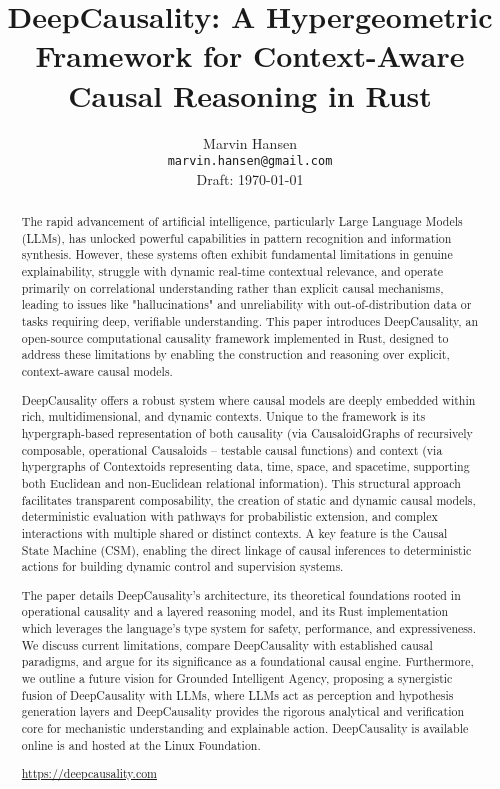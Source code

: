 \documentclass{article}
\title{DeepCausality: A Hypergeometric Framework for Context-Aware Causal Reasoning in Rust}
\author{
  Marvin Hansen \\
  \texttt{marvin.hansen@gmail.com} \\
  Draft: \today
}
\begin{document}
\maketitle

\begin{abstract}

The rapid advancement of artificial intelligence, particularly Large Language Models (LLMs), has unlocked powerful capabilities in pattern recognition and information synthesis. However, these systems often exhibit fundamental limitations in genuine explainability, struggle with dynamic real-time contextual relevance, and operate primarily on correlational understanding rather than explicit causal mechanisms, leading to issues like "hallucinations" and unreliability with out-of-distribution data or tasks requiring deep, verifiable understanding. This paper introduces DeepCausality, an open-source computational causality framework implemented in Rust, designed to address these limitations by enabling the construction and reasoning over explicit, context-aware causal models.


DeepCausality offers a robust system where causal models are deeply embedded within rich, multidimensional, and dynamic contexts. Unique to the framework is its hypergraph-based representation of both causality (via CausaloidGraphs of recursively composable, operational Causaloids – testable causal functions) and context (via hypergraphs of Contextoids representing data, time, space, and spacetime, supporting both Euclidean and non-Euclidean relational information). This structural approach facilitates transparent composability, the creation of static and dynamic causal models, deterministic evaluation with pathways for probabilistic extension, and complex interactions with multiple shared or distinct contexts. A key feature is the Causal State Machine (CSM), enabling the direct linkage of causal inferences to deterministic actions for building dynamic control and supervision systems.


The paper details DeepCausality’s architecture, its theoretical foundations rooted in operational causality and a layered reasoning model, and its Rust implementation which leverages the language's type system for safety, performance, and expressiveness. We discuss current limitations, compare DeepCausality with established causal paradigms, and argue for its significance as a foundational causal engine. Furthermore, we outline a future vision for Grounded Intelligent Agency, proposing a synergistic fusion of DeepCausality with LLMs, where LLMs act as perception and hypothesis generation layers and DeepCausality provides the rigorous analytical and verification core for mechanistic understanding and explainable action. DeepCausality is available online is and hosted at the Linux Foundation.

\begin{center}
    \url{https://deepcausality.com}
\end{center}

\end{abstract}
\end{document}
